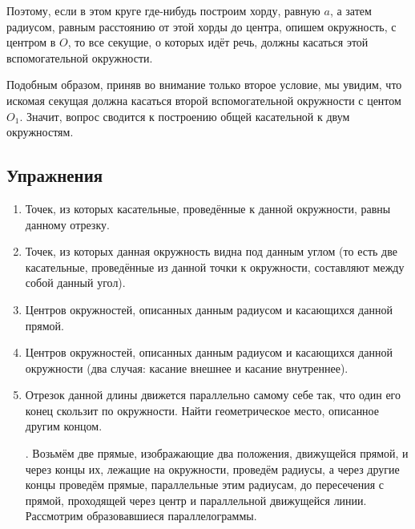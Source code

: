 Поэтому, если в этом круге где-нибудь построим хорду, равную $a$, а затем радиусом, равным расстоянию от этой хорды до центра, опишем окружность, с центром в $O$, то все секущие, о которых идёт речь, должны касаться этой вспомогательной окружности.

Подобным образом, приняв во внимание только второе условие, мы увидим, что искомая секущая должна касаться второй вспомогательной окружности с центом $O_1$.
Значит, вопрос сводится к построению общей касательной к двум окружностям.
{\small

\subsection*{Упражнения}

\begin{center}
\end{center}

\begin{enumerate}[noitemsep]

\item
Точек, из которых касательные, проведённые к данной окружности, равны данному отрезку.
 
\item

Точек, из которых данная окружность видна под данным углом (то есть две касательные, проведённые из данной точки к окружности, составляют между собой данный угол).



\item
Центров окружностей, описанных данным радиусом и касающихся данной прямой.

\item
Центров окружностей, описанных данным радиусом и касающихся данной окружности (два случая:
касание внешнее и касание внутреннее).

\item
Отрезок данной длины движется параллельно самому себе так, что один его конец скользит по окружности.
Найти геометрическое место, описанное другим концом.

\smallskip
{}.
Возьмём две прямые, изображающие два положения, движущейся прямой, и через концы их, лежащие на окружности, проведём радиусы, а через другие концы проведём прямые, параллельные этим радиусам, до пересечения с прямой, проходящей через центр и параллельной движущейся линии.
Рассмотрим образовавшиеся параллелограммы.


\end{enumerate}}
